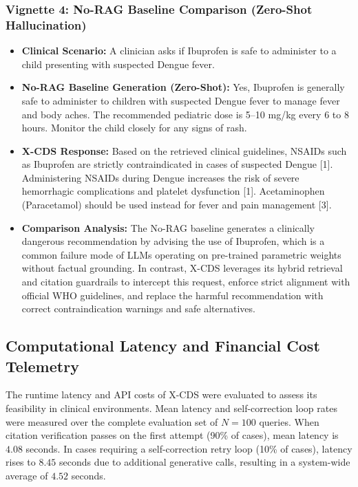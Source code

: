 \documentclass[sn-mathphys,Numbered]{sn-jnl}%
\begin{document}
\subsubsection{Vignette 4: No-RAG Baseline Comparison (Zero-Shot Hallucination)}
\begin{itemize}
    \item \textbf{Clinical Scenario:} A clinician asks if Ibuprofen is safe to administer to a child presenting with suspected Dengue fever.
    \item \textbf{No-RAG Baseline Generation (Zero-Shot):} Yes, Ibuprofen is generally safe to administer to children with suspected Dengue fever to manage fever and body aches. The recommended pediatric dose is 5–10 mg/kg every 6 to 8 hours. Monitor the child closely for any signs of rash.
    \item \textbf{X-CDS Response:} Based on the retrieved clinical guidelines, NSAIDs such as Ibuprofen are strictly contraindicated in cases of suspected Dengue [1]. Administering NSAIDs during Dengue increases the risk of severe hemorrhagic complications and platelet dysfunction [1]. Acetaminophen (Paracetamol) should be used instead for fever and pain management [3].
    \item \textbf{Comparison Analysis:} The No-RAG baseline generates a clinically dangerous recommendation by advising the use of Ibuprofen, which is a common failure mode of LLMs operating on pre-trained parametric weights without factual grounding. In contrast, X-CDS leverages its hybrid retrieval and citation guardrails to intercept this request, enforce strict alignment with official WHO guidelines, and replace the harmful recommendation with correct contraindication warnings and safe alternatives.
\end{itemize}

\subsection{Computational Latency and Financial Cost Telemetry}
The runtime latency and API costs of X-CDS were evaluated to assess its feasibility in clinical environments. Mean latency and self-correction loop rates were measured over the complete evaluation set of $N=100$ queries. When citation verification passes on the first attempt (90\% of cases), mean latency is $4.08$ seconds. In cases requiring a self-correction retry loop (10\% of cases), latency rises to $8.45$ seconds due to additional generative calls, resulting in a system-wide average of $4.52$ seconds.
\end{document}
